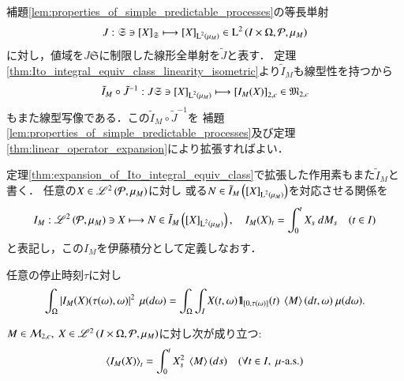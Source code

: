 	\begin{prf}
		補題\ref{lem:properties_of_simple_predictable_processes}の等長単射
		\begin{align}
			J:\mathfrak{S} \ni \left[X\right]_{\mathfrak{S}} \longmapsto \left[X\right]_{\operatorname{L}^{2} \left(\mu_M\right)} \in \operatorname{L}^{2} \left(I \times \Omega,\mathcal{P},\mu_M\right)
		\end{align}
		に対し，値域を$J\mathfrak{S}$に制限した線形全単射を$\tilde{J}$と表す．
		定理\ref{thm:Ito_integral_equiv_class_linearity_isometric}より$\tilde{I}_M$も線型性を持つから
		\begin{align}
			\tilde{I}_M \circ \tilde{J}^{-1}: J \mathfrak{S} \ni \left[X\right]_{\operatorname{L}^{2} \left(\mu_M\right)} \longmapsto \left[I_M(X)\right]_{2,c} \in \mathfrak{M}_{2,c}
		\end{align}
		もまた線型写像である．この$\tilde{I}_M \circ \tilde{J}^{-1}$を
		補題\ref{lem:properties_of_simple_predictable_processes}及び定理\ref{thm:linear_operator_expansion}により拡張すればよい．
		\QED
	\end{prf}
	
	\begin{screen}
		\begin{dfn}[二乗可積分可予測過程に対する伊藤積分]
			定理\ref{thm:expansion_of_Ito_integral_equiv_class}で拡張した作用素もまた$\tilde{I}_M$と書く．
			任意の$X \in \mathscr{L}^{2} \left(\mathcal{P},\mu_M\right)$に対し
			或る$N \in \tilde{I}_M\left( \left[X\right]_{\operatorname{L}^{2} \left(\mu_M\right)} \right)$を対応させる関係を
			\begin{align}
				I_M: \mathscr{L}^{2} \left(\mathcal{P},\mu_M\right) \ni X \longmapsto N \in \tilde{I}_M\left( \left[X\right]_{\operatorname{L}^{2} \left(\mu_M\right)} \right), \quad
				I_M(X)_t = \int_0^t X_s\ d M_s \quad (t \in I)
			\end{align}
			と表記し，この$I_M$を伊藤積分として定義しなおす．
		\end{dfn}
	\end{screen}
	
	\begin{screen}
		\begin{lem}[停止時刻で停めた伊藤積分]
			任意の停止時刻$\tau$に対し
			\begin{align}
				\int_\Omega \left| I_M(X)(\tau(\omega),\omega) \right|^2\ \mu(d\omega)
				= \int_\Omega \int_I X(t,\omega) \defunc_{[0,\tau(\omega)]}(t)\ \inprod<M>(dt,\omega)\ \mu(d\omega).
			\end{align}
		\end{lem}
	\end{screen}
	
	\begin{screen}
		\begin{prp}[伊藤積分の二次変分]
			$M \in \mathcal{M}_{2,c},\ X \in \mathscr{L}^{2} \left(I \times \Omega,\mathcal{P},\mu_M\right)$に対し次が成り立つ:
			\begin{align}
				\inprod<I_M(X)>_t = \int_0^t X_s^2\ \inprod<M>(ds)
				\quad (\forall t \in I,\ \mbox{$\mu$-a.s.})
			\end{align}
		\end{prp}
	\end{screen}